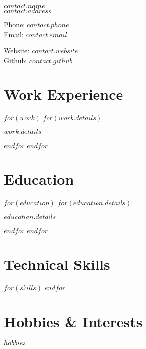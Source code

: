\documentclass{cv-class}
\begin{document}
\raggedright
{\LARGE $contact.name$}\\[0.2cm]
$contact.address$\\

\begin{minipage}[t]{0.6\textwidth}
  Phone: $contact.phone$\\
  Email: \href{mailto:$contact.email$}{$contact.email$}
\end{minipage}%
\hfill
\begin{minipage}[t]{0.4\textwidth}
  Website: \href{https://$contact.website$}{$contact.website$}\\
  Github: \href{https://$contact.github$}{$contact.github$}
\end{minipage}

\section*{Work Experience}
$for(work)$
$for(work.details)$
\begin{workitem}
  \item $work.details$
\end{workitem}
$endfor$
$endfor$

\section*{Education}
$for(education)$
$for(education.details)$
\begin{educationitem}
  \item $education.details$
\end{educationitem}
$endfor$
$endfor$

\section*{Technical Skills}
$for(skills)$
$endfor$

\section*{Hobbies \& Interests}
$hobbies$
\end{document}

